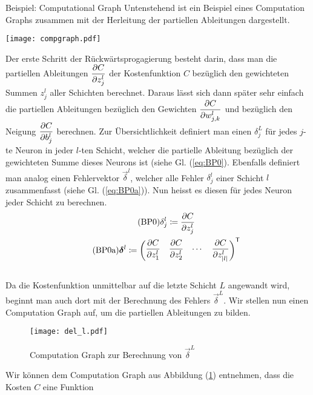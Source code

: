 \para{}
\begin{examplebox}{Beispiel: Computational Graph}
  Untenstehend ist ein Beispiel eines Computation
  Graphs zusammen mit der Herleitung der partiellen Ableitungen dargestellt.
  \para{}
  \begin{center}
    \texttt{[image: compgraph.pdf]}
  \end{center}
\end{examplebox}
\para{}
Der erste Schritt der Rückwärtsprogagierung besteht darin, dass man die partiellen Ableitungen $\displaystyle\frac{\partial C}{\partial z_j^l}$
der Kostenfunktion $C$ bezüglich den gewichteten Summen $z_j^l$ aller Schichten
berechnet. Daraus lässt sich dann später sehr einfach die partiellen Ableitungen
bezüglich den Gewichten $\displaystyle\frac{\partial C}{\partial w_{j,k}^l}$ und bezüglich den Neigung
$\displaystyle\frac{\partial C}{\partial b_j^l}$ berechnen.
\para{}
Zur Übersichtlichkeit definiert man einen  $\delta_j^L$ für
jedes $j$-te Neuron in jeder $l$-ten Schicht, welcher die partielle Ableitung bezüglich der
gewichteten Summe dieses Neurons ist (siehe Gl. (\ref{eq:BP0}). Ebenfalls definiert man analog einen Fehlervektor
$\vec{\delta}^l$, welcher alle Fehler $\delta_j^l$ einer Schicht $l$
zusammenfasst (siehe Gl. (\ref{eq:BP0a})). Nun heisst es diesen für jedes Neuron jeder Schicht zu
berechnen.
\\
\begin{gather}
  \tag{BP0}\label{eq:BP0} \delta_j^l \coloneqq \frac{\partial C}{\partial z_j^l} \\
  \tag{BP0a}\label{eq:BP0a} \bm{\delta}^l \coloneqq \begin{pmatrix} \displaystyle\frac{\partial C}{\partial z_1^l} & \displaystyle\frac{\partial C}{\partial z_2^l} & \cdots & \displaystyle\frac{\partial C}{\partial z_{|l|}^l} \end{pmatrix}^{\mathsf{T}}
\end{gather}
\\
Da die Kostenfunktion unmittelbar auf die letzte Schicht $L$ angewandt wird, beginnt
man auch dort mit der Berechnung des Fehlers $\vec{\delta}^L$.
Wir stellen nun einen Computation Graph auf, um die partiellen Ableitungen zu bilden.
\para{}
\begin{figure}[h!]
  \centering
  \texttt{[image: del\_l.pdf]}
  \caption{Computation Graph zur Berechnung von $\vec{\delta}^L$}
  \label{fig:cg_L}
\end{figure}
\para{}
Wir können dem Computation Graph aus Abbildung (\ref{fig:cg_L}) entnehmen, dass die Kosten $C$ eine Funktion

